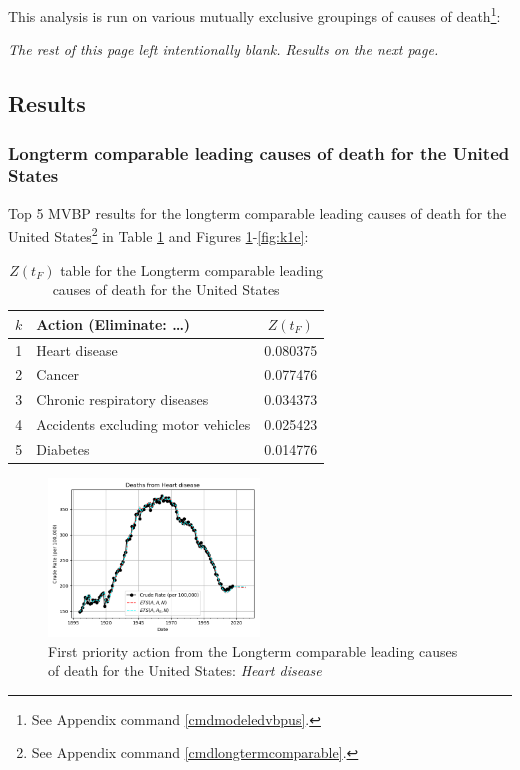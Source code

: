 \documentclass[10pt, a4paper, twocolumn]{IEEEconf}
\begin{document}
This analysis is run on various mutually exclusive groupings of causes of death\footnote{See Appendix command \ref{cmdmodeledvbpus}.}:

\textit{\scriptsize{The rest of this page left intentionally blank. Results on the next page.}}

\clearpage

\subsection{Results}

\subsubsection{Longterm comparable leading causes of death for the United States}

Top 5 MVBP results for the longterm comparable leading causes of death for the United States\footnote{See Appendix command \ref{cmdlongtermcomparable}.} in Table \ref{table:ztable1} and Figures \ref{fig:k1a}-\ref{fig:k1e}:

\begin{table}[H]
  \centering
  \begin{tabular}{clc}
    \toprule
      $k$ & Action (Eliminate: \ldots) & $Z(t_F)$ \\
    \midrule
      1 &                      Heart disease & 0.080375 \\
      2 &                             Cancer & 0.077476 \\
      3 &       Chronic respiratory diseases & 0.034373 \\
      4 & Accidents excluding motor vehicles & 0.025423 \\
      5 &                           Diabetes & 0.014776 \\
    \bottomrule
  \end{tabular}
  \caption{$Z(t_F)$ table for the Longterm comparable leading causes of death for the United States}
  \label{table:ztable1}
\end{table}

\begin{figure}[H]
  \centering
  \includegraphics[width=0.5\textwidth]{results/US_ICD_LONGTERM_COMPARABLE_LEADING/Heart_disease_ets.png}
  \caption{First priority action from the Longterm comparable leading causes of death for the United States: \textit{Heart disease}}\label{fig:k1a}
\end{figure}
\end{document}
